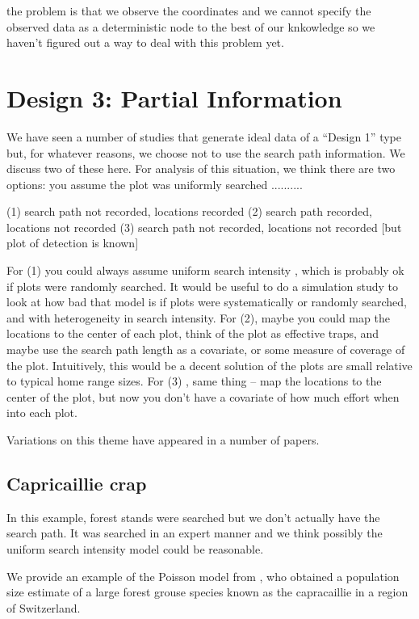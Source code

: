 the problem is that we observe the coordinates and we cannot specify
the observed data as a deterministic node to the best of our
knkowledge so we haven't figured out a way to deal with this problem
yet. 



\section{ Design 3: Partial Information}

We have seen a number of studies that generate ideal data of a ``Design
1'' type but, for whatever reasons, we choose not to use the search
path information.   We discuss two of these here.
For analysis of this situation, we think there are two options:
you assume the plot was uniformly searched ..........

(1) search path not recorded, locations recorded
(2) search path recorded, locations not recorded
(3) search path not recorded, locations not recorded [but plot of
detection is known]

For (1) you could always assume uniform search intensity , 
which is probably ok if plots were randomly searched.
It would be useful to do a simulation study to look at how bad that
model is if plots were systematically or randomly searched, and with
heterogeneity in search intensity.
For (2), maybe you could map the locations to the center of each plot,
think of the plot as effective traps, and maybe use the search path
length as a covariate, or some measure of coverage of the
plot. Intuitively, this would be a decent solution of the plots are
small relative to typical home range sizes.
For (3) , same thing -- map the locations to the center of the plot,
but now you don't have a covariate of how much effort when into each
plot. 

Variations on this theme have appeared in a number of papers.

\subsection{Capricaillie crap}

In this example, forest stands were searched but we don't actually
have the search path. It was searched in an expert manner and we
think possibly the uniform search intensity model could be
reasonable. 

We provide an example of the Poisson model from
 \citet{mollet_etal:2012}, who obtained a population
size estimate  of a large forest grouse species known as the
capracaillie in a region of Switzerland.


